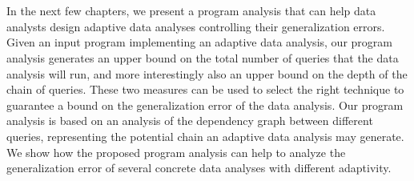 \chapter*{}

In the next few chapters, we present a program analysis that can help data analysts design adaptive data analyses controlling their generalization errors. 
Given an input program implementing an adaptive data analysis, our program analysis generates an upper bound on the total number of queries that the data analysis will run, and more interestingly also an upper bound on the depth of the chain of queries. 
These two measures can be used to select the right technique to guarantee a bound on the generalization error of the data analysis. 
Our program analysis is based on an analysis of the dependency graph between different queries, representing the potential chain an adaptive data analysis may generate. 
We show how the proposed program analysis can help to analyze the generalization error of several concrete data analyses with different adaptivity.